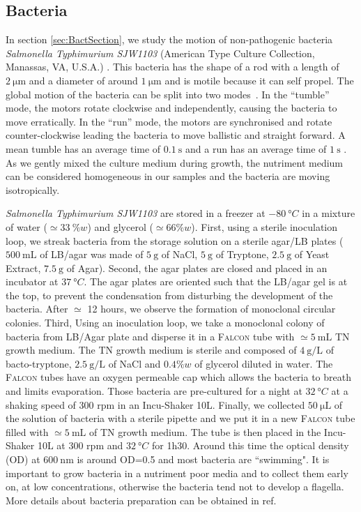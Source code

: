 \documentclass[prb,reprint,amsmath,amssymb]{revtex4-1}
\newcommand{\tg}[1]{{\color{magenta}#1}} %
\begin{document}
\subsection{Bacteria}
In section \ref{sec:BactSection}, we study the motion of non-pathogenic bacteria \tg{\textit{Salmonella Typhimurium SJW1103}  (American Type Culture Collection, Manassas, VA, U.S.A.)} \citep{21_fabrega2013salmonella}. \tg{This bacteria has the shape of a rod with a length of $\SI{2}{\micro\meter}$ and a diameter of around $\SI{1}{\micro\meter}$ and is motile because it can self propel. The global motion of the bacteria can be split into two modes~\cite{Nelson2004}. In the ``tumble'' mode, the motors rotate clockwise and independently, causing the bacteria to move erratically. In the ``run'' mode, the motors are synchronised and rotate counter-clockwise leading the bacteria to move ballistic and straight forward. A mean tumble has an average time of $\SI{0.1}{\second}$ and a run has an average time of $\SI{1}{\second}$ \citep{5_berg2000motile}. As we gently mixed the culture medium during growth, the nutriment medium can be considered homogeneous in our samples and the bacteria are moving isotropically.}

\textit{Salmonella Typhimurium SJW1103}  are stored in a freezer at $\SI{-80}{\degree C}$ in a mixture of water ($\simeq \SI{33}{\%} w$) and glycerol ($\simeq 66\% w$). First, using a sterile inoculation loop, we streak bacteria from the storage solution on a sterile agar/LB plates  ($\SI{500}{\milli\liter}$ of LB/agar was made of $\SI{5}{\gram}$ of NaCl, $\SI{5}{\gram}$ of Tryptone, $\SI{2.5}{\gram}$ of Yeast Extract, $\SI{7.5}{\gram}$ of Agar). Second, the agar plates are closed and placed in an incubator at $\SI{37}{\degree C}$. The agar plates are oriented such that the LB/agar gel is at the top, to prevent the condensation from disturbing the development of the bacteria. After $\simeq$ 12 hours, we observe the formation of monoclonal circular colonies. Third, Using an inoculation loop, we take a monoclonal colony of bacteria from LB/Agar plate and disperse it in a \textsc{Falcon} tube with $\simeq \SI{5}{\milli\liter}$ TN growth medium. The TN growth medium is sterile and composed of $\SI{4}{\gram\per\liter}$ of bacto-tryptone, $\SI{2.5}{\gram\per\liter}$ of NaCl and $0.4\% w$ of glycerol diluted in water. The \textsc{Falcon} tubes have an oxygen permeable cap which allows the bacteria to breath and limits evaporation. Those bacteria are pre-cultured for a night at $\SI{32}{\degree C}$ \tg{at a shaking speed of} 300 rpm in an Incu-Shaker 10L. Finally, we collected $\SI{50}{\micro\liter}$ of the solution of bacteria with a sterile pipette and we put it in a new \textsc{Falcon} tube filled with $\simeq \SI{5}{\milli\liter}$ of TN growth medium. The tube is then placed in the Incu-Shaker 10L at 300 rpm and $\SI{32}{\degree C}$ for 1h30. Around this time the optical density (OD) at $\SI{600}{\nano\meter}$ is around OD=0.5 and most bacteria are ``swimming". It is important to grow bacteria in a nutriment poor media and to collect them early on, at low concentrations, otherwise the bacteria tend not to develop a flagella. More details about bacteria preparation can be obtained in ref\cite{Schwarz2015, ajp2010hagen, XXX}.
\end{document}

